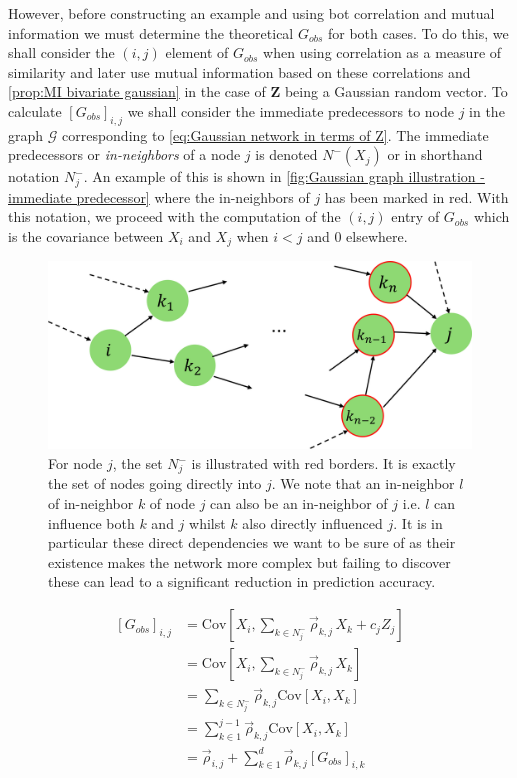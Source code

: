 \documentclass[../Thesis.tex]{subfiles}
\begin{document}
However, before constructing an example and using bot correlation and mutual information we must determine the theoretical $G_{obs}$ for both cases. To do this, we shall consider the $(i,j)$ element of $G_{obs}$ when using correlation as a measure of similarity and later use mutual information based on these correlations and \autoref{prop:MI bivariate gaussian} in the case of $\boldsymbol Z$ being a Gaussian random vector. To calculate $\left[G_{obs}\right]_{i,j}$ we shall consider the immediate predecessors to node $j$ in the graph $\mathcal{G}$ corresponding to \autoref{eq:Gaussian network in terms of Z}. The immediate predecessors or \textit{in-neighbors} of a node $j$ is denoted $N^-\left(X_j\right)$ or in shorthand notation $N^-_j$. An example of this is shown in \autoref{fig:Gaussian graph illustration - immediate predecessor} where the in-neighbors of $j$ has been marked in red. With this notation, we proceed with the computation of the $(i,j)$ entry of $G_{obs}$ which is the covariance between $X_i$ and $X_j$ when $i < j$ and $0$ elsewhere.
\begin{figure}[h]
    \centering
    \includegraphics[width = .7\linewidth]{figures/ND examples/Gaussian graph illustration - immediate predecessor.png}
    \caption{For node $j$, the set $N^-_j$ is illustrated with red borders. It is exactly the set of nodes going directly into $j$. We note that an in-neighbor $l$ of in-neighbor $k$ of node $j$ can also be an in-neighbor of $j$ i.e. $l$ can influence both $k$ and $j$ whilst $k$ also directly influenced $j$. It is in particular these direct dependencies we want to be sure of as their existence makes the network more complex but failing to discover these can lead to a significant reduction in prediction accuracy.}
    \label{fig:Gaussian graph illustration - immediate predecessor}
\end{figure}
\begin{equation}
    \begin{split}
        \left[G_{obs}\right]_{i,j} & = \text{Cov}\left[X_i , \sum_{k \in N^-_j} \vec{\rho}_{k,j} \, X_k + c_j Z_j\right]           \\
                                   & = \text{Cov}\left[X_i , \sum_{k \in N^-_j} \vec{\rho}_{k,j} \, X_k\right]           \\
                                   & = \sum_{k \in N^-_j}\vec{\rho}_{k,j} \text{Cov}\left[X_i, X_k\right]                \\
                                   & = \sum_{k \in 1}^{j-1} \vec{\rho}_{k,j} \text{Cov}\left[X_i, X_k\right]             \\
                                   & = \vec{\rho}_{i,j} + \sum_{k \in 1}^{d} \vec{\rho}_{k,j} \left[G_{obs}\right]_{i,k}
    \end{split}
\end{equation}
\end{document}
